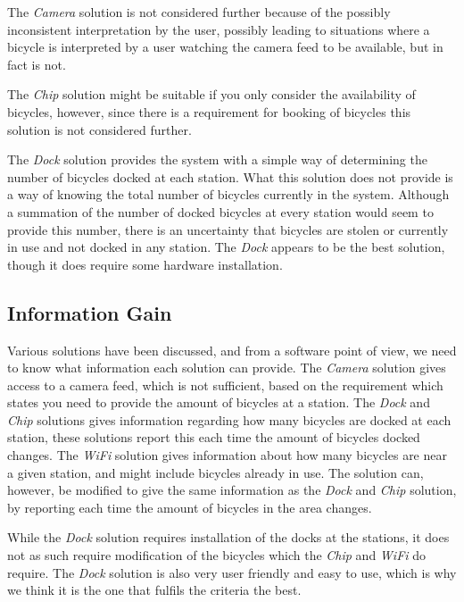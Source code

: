 The \textit{Camera} solution is not considered further because of the possibly inconsistent interpretation by the user, possibly leading to situations where a bicycle is interpreted by a user watching the camera feed to be available, but in fact is not.

The \textit{Chip} solution might be suitable if you only consider the availability of bicycles, however, since there is a requirement for booking of bicycles this solution is not considered further.

The \textit{Dock} solution provides the system with a simple way of determining the number of bicycles docked at each station.
What this solution does not provide is a way of knowing the total number of bicycles currently in the system.
Although a summation of the number of docked bicycles at every station would seem to provide this number, there is an uncertainty that bicycles are stolen or currently in use and not docked in any station.
The \textit{Dock} appears to be the best solution, though it does require some hardware installation.

\subsection{Information Gain}
Various solutions have been discussed, and from a software point of view, we need to know what information each solution can provide.
The \textit{Camera} solution gives access to a camera feed, which is not sufficient, based on the requirement which states you need to provide the amount of bicycles at a station.
The \textit{Dock} and \textit{Chip} solutions gives information regarding how many bicycles are docked at each station, these solutions report this each time the amount of bicycles docked changes.
The \textit{WiFi} solution gives information about how many bicycles are near a given station, and might include bicycles already in use.
The solution can, however, be modified to give the same information as the \textit{Dock} and \textit{Chip} solution, by reporting each time the amount of bicycles in the area changes.

While the \textit{Dock} solution requires installation of the docks at the stations, it does not as such require modification of the bicycles which the \textit{Chip} and \textit{WiFi} do require. 
The \textit{Dock} solution is also very user friendly and easy to use, which is why we think it is the one that fulfils the criteria the best.